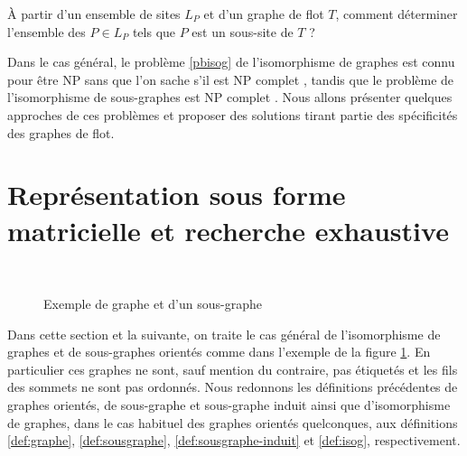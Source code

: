 
\begin{pb}\label{pbisosgbase}
 À partir d'un ensemble de sites $L_P$ et d'un graphe de flot $T$, comment déterminer l'ensemble des $P\in L_P$ tels que $P$ est un sous-site de $T$ ?
\end{pb}

Dans le cas général, le problème \ref{pbisog} de l'isomorphisme de graphes est connu pour être NP sans que l'on sache s'il est NP complet \cite{Kob94}, tandis que le problème de l'isomorphisme de sous-graphes est NP complet \cite{W05}.
Nous allons présenter quelques approches de ces problèmes et proposer des solutions tirant partie des spécificités des graphes de flot.

\section{Représentation sous forme matricielle et recherche exhaustive}
\begin{figure}[ht]
\begin{center}
  \subfigure[Graphe T]{
\label{fig:ex-graphe}
\epsfig{figure=supports/algos/images/c_gT.pdf,height=3.5cm}}\quad
  \subfigure[Graphe P, isomorphe à un sous-graphe de T]{
\label{fig:ex-sg}
\epsfig{figure=supports/algos/images/c_gP.pdf,height=3cm}}\\
\end{center}
\caption{Exemple de graphe et d'un sous-graphe}
\label{fig:ex-graphe-sg}
\end{figure}

Dans cette section et la suivante, on traite le cas général de l'isomorphisme de graphes et de sous-graphes orientés comme dans l'exemple de la figure \ref{fig:ex-graphe-sg}. En particulier ces graphes ne sont, sauf mention du contraire, pas étiquetés et les fils des sommets ne sont pas ordonnés.
Nous redonnons les définitions précédentes de graphes orientés, de sous-graphe et sous-graphe induit ainsi que d'isomorphisme de graphes, dans le cas habituel des graphes orientés quelconques, aux définitions \ref{def:graphe}, \ref{def:sousgraphe}, \ref{def:sousgraphe-induit} et \ref{def:isog}, respectivement.

